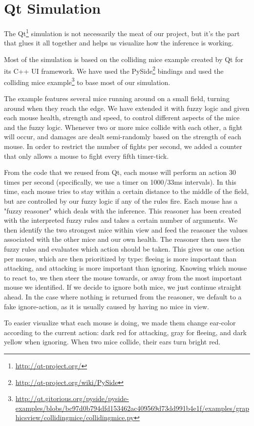 \section{Qt Simulation}\label{qt simulation}
The Qt\footnote{\url{http://qt-project.org/}} simulation is not necessarily the
meat of our project, but it's the part that glues it all together and helps us
visualize how the inference is working.

Most of the simulation is based on the colliding mice example created by Qt
for its C++ UI framework. We have used the PySide\footnote{\url{http://qt-project.org/wiki/PySide}}
bindings and used the colliding mice example\footnote{\url{http://qt.gitorious.org/pyside/pyside-examples/blobs/bc97d0b794dfd153462ac409569d73dd991b4e1f/examples/graphicsview/collidingmice/collidingmice.py}}
to base most of our simulation.

The example features several mice running around on a small field, turning around when they
reach the edge. We have extended it with fuzzy logic and given each mouse health, strength and speed,
to control different aspects of the mice and the fuzzy logic. Whenever two or more mice collide with each
other, a fight will occur, and damages are dealt semi-randomly based on the strength of each mouse.
In order to restrict the number of fights per second, we added a counter that only allows a mouse to fight
every fifth timer-tick.

From the code that we reused from Qt, each mouse will perform an action 30 times per
second (specifically, we use a timer on 1000/33ms intervals). In this time, each mouse tries to stay within
a certain distance to the middle of the field, but are controlled by our fuzzy logic if any of the rules fire.
Each mouse has a "fuzzy reasoner" which deals with the inference. This reasoner has been created
with the interpreted fuzzy rules and takes a certain number of arguments. We then
identify the two strongest mice within view and feed the reasoner the values associated
with the other mice and our own health. The reasoner then uses the fuzzy rules and
evaluates which action should be taken. This gives us one action per mouse, 
which are then prioritized by type: fleeing is more important than attacking,
and attacking is more important than ignoring. Knowing which mouse to react to, we
then steer the mouse towards, or away from the most important mouse we identified.
If we decide to ignore both mice, we just continue straight ahead. In the case where nothing
is returned from the reasoner, we default to a fake ignore-action, as it is usually
caused by having no mice in view.

To easier visualize what each mouse is doing, we made them change ear-color according to the current action:
dark red for attacking, gray for fleeing, and dark yellow when ignoring. When two mice collide, their ears
turn bright red.